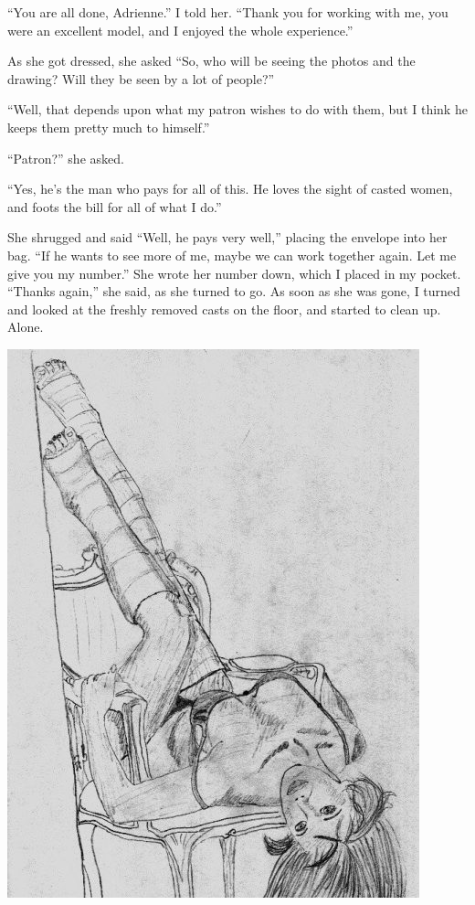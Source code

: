 ``You are all done, Adrienne.'' I told her. ``Thank you for working with me, you were an
excellent model, and I enjoyed the whole experience.''

As she got dressed, she asked ``So, who will be seeing the photos and the drawing? Will they
be seen by a lot of people?''

``Well, that depends upon what my patron wishes to do with them, but I think he keeps them
pretty much to himself.''

``Patron?'' she asked.

``Yes, he's the man who pays for all of this. He loves the sight of casted women, and foots
the bill for all of what I do.''

She shrugged and said ``Well, he pays very well,'' placing the envelope into her bag. ``If
he wants to see more of me, maybe we can work together again. Let me give you my number.'' She
wrote her number down, which I placed in my pocket. ``Thanks again,'' she said, as she turned to
go. As soon as she was gone, I turned and looked at the freshly removed casts on the floor, and
started to clean up. Alone.

\begin{center}
\includegraphics{images/kicks02.jpg}
\end{center}
